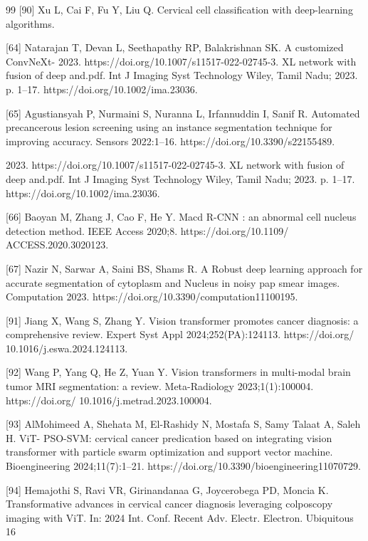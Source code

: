 \documentclass[final,5p,times,twocolumn,authoryear]{elsarticle}
\begin{document}
\begin{thebibliography}{99}
 [90] Xu L, Cai F, Fu Y, Liu Q. Cervical cell classification with deep-learning algorithms.

 [64] Natarajan T, Devan L, Seethapathy RP, Balakrishnan SK. A customized ConvNeXt-
2023. https://doi.org/10.1007/s11517-022-02745-3. XL network with fusion of deep and.pdf. Int J Imaging Syst Technology Wiley, Tamil Nadu; 2023. p. 1–17. https://doi.org/10.1002/ima.23036.

 [65] Agustiansyah P, Nurmaini S, Nuranna L, Irfannuddin I, Sanif R. Automated precancerous lesion screening using an instance segmentation technique for improving accuracy. Sensors 2022:1–16. https://doi.org/10.3390/s22155489.

 2023. https://doi.org/10.1007/s11517-022-02745-3. XL network with fusion of deep and.pdf. Int J Imaging Syst Technology Wiley, Tamil Nadu; 2023. p. 1–17. https://doi.org/10.1002/ima.23036.

 [66] Baoyan M, Zhang J, Cao F, He Y. Macd R-CNN : an abnormal cell nucleus detection method. IEEE Access 2020;8. https://doi.org/10.1109/ ACCESS.2020.3020123.

 [67] Nazir N, Sarwar A, Saini BS, Shams R. A Robust deep learning approach for accurate segmentation of cytoplasm and Nucleus in noisy pap smear images. Computation 2023. https://doi.org/10.3390/computation11100195.

 [91] Jiang X, Wang S, Zhang Y. Vision transformer promotes cancer diagnosis: a comprehensive review. Expert Syst Appl 2024;252(PA):124113. https://doi.org/ 10.1016/j.eswa.2024.124113.

 [92] Wang P, Yang Q, He Z, Yuan Y. Vision transformers in multi-modal brain tumor MRI segmentation: a review. Meta-Radiology 2023;1(1):100004. https://doi.org/ 10.1016/j.metrad.2023.100004.

 [93] AlMohimeed A, Shehata M, El-Rashidy N, Mostafa S, Samy Talaat A, Saleh H. ViT- PSO-SVM: cervical cancer predication based on integrating vision transformer with particle swarm optimization and support vector machine. Bioengineering 2024;11(7):1–21. https://doi.org/10.3390/bioengineering11070729.

 [94] Hemajothi S, Ravi VR, Girinandanaa G, Joycerobega PD, Moncia K. Transformative advances in cervical cancer diagnosis leveraging colposcopy imaging with ViT. In: 2024 Int. Conf. Recent Adv. Electr. Electron. Ubiquitous 16


\end{thebibliography}
\end{document}
